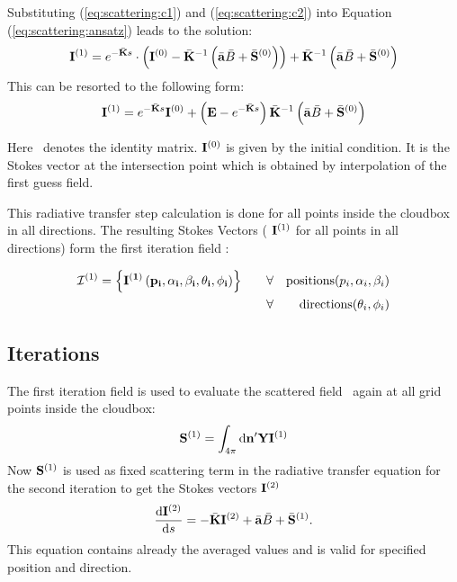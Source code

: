 Substituting (\ref{eq:scattering:c1}) and (\ref{eq:scattering:c2})
into Equation (\ref{eq:scattering:ansatz}) leads to the solution:
\begin{eqnarray}
  {\bf I}^{(1)} =  e^{-\bar{{\bf K}}s}\cdot\left({\bf I}^{(0)} -\bar{{\bf K}}^{-1}\left(\bar{{\bf a}} \bar{B} +\bar{{\bf S}}^{(0)}\right)\right) + 
 \bar{{\bf K}}^{-1}\left(\bar{{\bf a}} \bar{B} +\bar{{\bf S}}^{(0)}\right)
\end{eqnarray}
This can be resorted to the following form:
\begin{eqnarray}
\label{eq:scattering:vrte_sol}
 {\bf I}^{(1)} =  e^{-\bar{{\bf K}}s} {\bf I}^{(0)} + \left( {\bf E} -  e^{-\bar{{\bf K}}s}\right)  \bar{{\bf K}}^{-1}\left(\bar{{\bf a}} \bar{B} +\bar{{\bf S}}^{(0)}\right)
\end{eqnarray}

Here \IdnMat\ denotes the identity matrix.  ${\bf I}^{(0)}$ is given
by the initial condition. It is the Stokes vector at the intersection
point which is obtained by interpolation of the first guess field.

This radiative transfer step calculation is done for all points inside
the cloudbox in all directions. The resulting Stokes Vectors (
${\bf I}^{(1)}$ for all points in all directions) form the first
iteration field :

\begin{eqnarray}
{\mathcal I}^{(1)} = \left\{ \bf{I}^{(1)} \left( p_i, \alpha_i, \beta_i, \theta_i, \phi_i\right)\right\}  \qquad  
&\forall& {\rm positions } (p_i,\alpha_i, \beta_i)\\
&\forall& {\rm directions } (\theta_i,\phi_i)
\end{eqnarray}


\subsection{Iterations}

The first iteration field is used to evaluate the scattered field
\ScaInt\ again at all grid points inside the cloudbox:
\begin{eqnarray}
  {\bf S}^{(1)} = \int_{4\pi} \mathrm{d} {\bf n}^\prime
  {\bf Y} {\bf I}^{(1)} 
\end{eqnarray}
Now ${\bf S}^{(1)}$ is used as fixed scattering term in the radiative
transfer equation for the second iteration to get the Stokes vectors
${\bf I}^{(2)}$
\begin{eqnarray}
     \frac{\mathrm{d} {\bf I}^{(2)}}{\mathrm{d} s} =
     -\bar{{\bf K}} {\bf I}^{(2)} + \bar{{\bf a}} \bar{B}
     +\bar{{\bf S}}^{(1)}.
\end{eqnarray} 
This equation contains already the averaged values and is valid for
specified position and direction.
 
